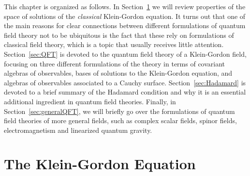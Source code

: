\documentclass[letterpaper,12pt,titlepage,oneside,final]{book}
\newcommand{\trr}[1]{\textcolor{red}{#1}}
\begin{document}
This chapter is organized as follows. In Section~\ref{sec:KG} we will review properties of the space of solutions of the \textit{classical} Klein-Gordon equation. It turns out that one of the main reasons for clear connections between different formulations of quantum field theory not to be ubiquitous is the fact that these rely on formulations of classical field theory, which is a topic that usually receives little attention. Section~\ref{sec:QFT} is devoted to the quantum field theory of a Klein-Gordon field, focusing on three different formulations of the theory in terms of covariant algebras of observables, bases of solutions to the Klein-Gordon equation, and algebras of observables associated to a Cauchy surface. Section~\ref{sec:Hadamard} is devoted to a brief summary of the Hadamard condition and why it is an essential additional ingredient in quantum field theories. Finally, in Section~\ref{sec:generalQFT}, we will briefly go over the formulations of quantum field theories of more general fields, such as complex scalar fields, spinor fields, electromagnetism and linearized quantum gravity.




\section{The Klein-Gordon Equation}\label{sec:KG}

\end{document}
